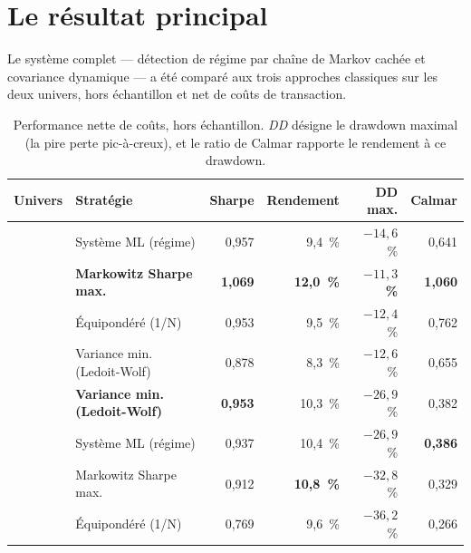 \section{Le résultat principal}

Le système complet — détection de régime par chaîne de Markov cachée et
covariance dynamique — a été comparé aux trois approches classiques sur les deux
univers, hors échantillon et net de coûts de transaction.

\begin{table}[htbp]
  \centering
  \caption[Performance comparée, hors échantillon]{Performance nette de coûts,
  hors échantillon. \emph{DD} désigne le drawdown maximal (la pire perte
  pic-à-creux), et le ratio de Calmar rapporte le rendement à ce drawdown.}
  \label{tab:headline}
  \small
  \begin{tabular}{llrrrr}
    \toprule
    Univers & Stratégie & Sharpe & Rendement & DD max. & Calmar \\
    \midrule
      & Système ML (régime)               & 0,957 &  9,4~\% & $-14{,}6$~\% & 0,641 \\
      & \textbf{Markowitz Sharpe max.}   & \textbf{1,069} & \textbf{12,0~\%} & \textbf{$-11{,}3$~\%} & \textbf{1,060} \\
      & Équipondéré (1/N)                 & 0,953 &  9,5~\% & $-12{,}4$~\% & 0,762 \\
      & Variance min. (Ledoit-Wolf)       & 0,878 &  8,3~\% & $-12{,}6$~\% & 0,655 \\
    \midrule
      & \textbf{Variance min. (Ledoit-Wolf)} & \textbf{0,953} & 10,3~\% & $-26{,}9$~\% & 0,382 \\
      & Système ML (régime)               & 0,937 & 10,4~\% & $-26{,}9$~\% & \textbf{0,386} \\
      & Markowitz Sharpe max.             & 0,912 & \textbf{10,8~\%} & $-32{,}8$~\% & 0,329 \\
      & Équipondéré (1/N)                 & 0,769 &  9,6~\% & $-36{,}2$~\% & 0,266 \\
    \bottomrule
  \end{tabular}
\end{table}

